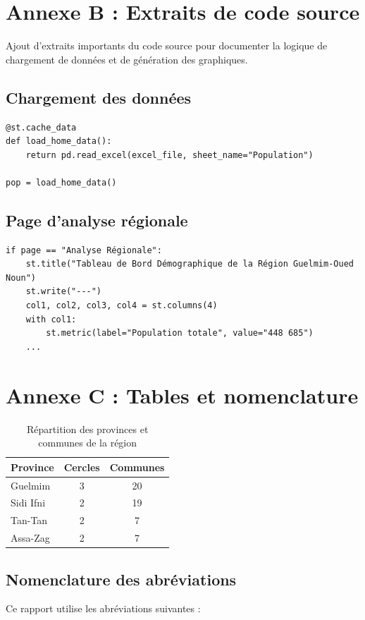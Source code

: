 \documentclass[12pt,a4paper,oneside]{report}
\begin{document}
\chapter{Annexe B : Extraits de code source}
Ajout d'extraits importants du code source pour documenter la logique de chargement de données et de génération des graphiques.

\section{Chargement des données}
\begin{verbatim}
@st.cache_data
def load_home_data():
    return pd.read_excel(excel_file, sheet_name="Population")

pop = load_home_data()
\end{verbatim}

\section{Page d'analyse régionale}
\begin{verbatim}
if page == "Analyse Régionale":
    st.title("Tableau de Bord Démographique de la Région Guelmim-Oued Noun")
    st.write("---")
    col1, col2, col3, col4 = st.columns(4)
    with col1:
        st.metric(label="Population totale", value="448 685")
    ...
\end{verbatim}

\chapter{Annexe C : Tables et nomenclature}

\begin{table}[H]
  \centering
  \caption{Répartition des provinces et communes de la région}
  \begin{tabular}{lcc}
    \toprule
    Province & Cercles & Communes \\
    \midrule
    Guelmim & 3 & 20 \\
    Sidi Ifni & 2 & 19 \\
    Tan-Tan & 2 & 7 \\
    Assa-Zag & 2 & 7 \\
    \bottomrule
  \end{tabular}
  \label{tab:provinces}
\end{table}

\section{Nomenclature des abréviations}
Ce rapport utilise les abréviations suivantes :
\end{document}

